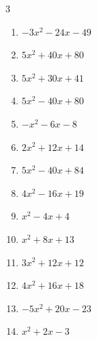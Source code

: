 \begin{multicols}{3}
\begin{enumerate}
  \item $-3x^{2}-24x-49$


  \item $5x^{2}+40x+80$


  \item $5x^{2}+30x+41$


  \item $5x^{2}-40x+80$


  \item $-x^{2}-6x-8$


  \item $2x^{2}+12x+14$


  \item $5x^{2}-40x+84$


\columnbreak %

  \item $4x^{2}-16x+19$


  \item $x^{2}-4x+4$


  \item $x^{2}+8x+13$


  \item $3x^{2}+12x+12$


  \item $4x^{2}+16x+18$


  \item $-5x^{2}+20x-23$


  \item $x^{2}+2x-3$


\end{enumerate}
\end{multicols}
